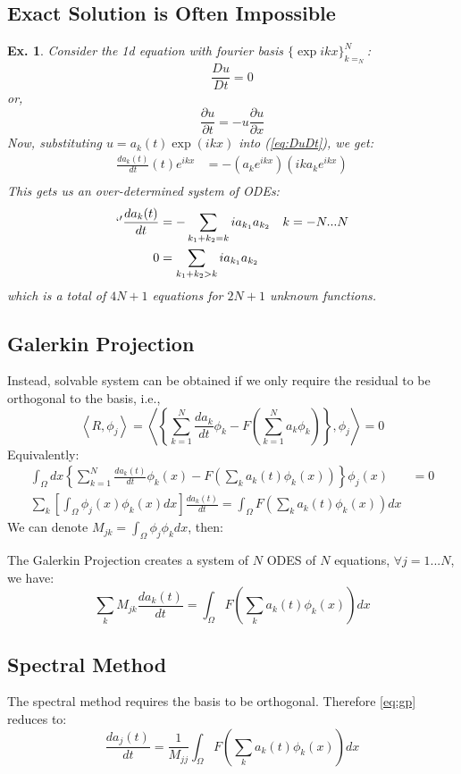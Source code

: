 \documentclass[14pt, twocolumn]{article}
\newtheorem{ex}{Ex.}
\newenvironment{tbox}{
    \begin{tcolorbox}[sharp corners, colback=white]
    
}{
    \end{tcolorbox}
}
\begin{document}
\subsection{Exact Solution is Often Impossible}

\begin{ex}
    Consider the 1d equation with fourier basis $\{\exp{ikx}\}_{k=_N}^N$:
    \begin{equation}
        \frac{Du}{Dt} = 0
            \label{eq:DuDt}
    \end{equation}
    or, 
    $$\frac{\partial u}{\partial t}= -u\frac{\partial u}{\partial x}$$
    Now, substituting $u=a_k(t)\exp(ikx)$ into (\ref{eq:DuDt}), we get:
    \begin{align*}
        \frac{da_k(t)}{dt}(t)e^{ikx} &= -(a_ke^{ikx})(ika_ke^{ikx}) \\
    \end{align*}
    This gets us an over-determined system of ODEs:
    \begin{equation}
        \begin{align}`'
            \frac{da_k(t)}{dt} &=  -\sum_{k_1+k_2=k} ia_{k_1}a_{k_2} & k=-N...N \\
            0 &= \sum_{k_1+k_2>k}  ia_{k_1}a_{k_2} &
        \end{align}
    \end{equation}
    which is a total of $4N+1$ equations for $2N+1$ unknown functions. 

\end{ex}

\subsection{Galerkin Projection}
Instead, solvable system can be obtained if we only require the residual to be orthogonal to  
the basis, i.e.,
$$
\left\langle R,\phi_j \right\rangle = \left\langle \left\{\sum_{k=1}^N \frac{da_k}{dt}\phi_k - F\left(\sum_{k=1}^N a_k\phi_k\right)\right\},\phi_j \right\rangle =0
$$
Equivalently:
\begin{align*}
    \int_{\Omega} dx \left\{\sum_{k=1}^N\frac{da_k(t)}{dt}\phi_k(x) - F\left(\sum_k a_k(t)\phi_k(x)\right) \right\} \phi_j(x) &=0 \\
    \sum_{k} \left[ \int_{\Omega}\phi_j(x)\phi_k(x)dx\right] \frac{da_k(t)}{dt} = \int_{\Omega}  F\left(\sum_k a_k(t)\phi_k(x)\right)dx
\end{align*}
We can denote $M_{jk}=\int_{\Omega}\phi_j \phi_k dx$, then:
\begin{tbox}
    The Galerkin Projection creates a system of $N$ ODES of $N$ equations, $\forall j=1...N$, we have:
    \begin{equation}
        \sum_k M_{jk} \frac{da_k(t)}{dt} = \int_{\Omega}  F\left(\sum_k a_k(t)\phi_k(x)\right)dx 
        \label{eq:gp}
    \end{equation}
\end{tbox}

\subsection{Spectral Method}
The spectral method requires the basis to be orthogonal. Therefore \ref{eq:gp} reduces to:
\begin{equation}
    \frac{da_j(t)}{dt} = \frac{1}{M_{jj}}\int_{\Omega}  F\left(\sum_k a_k(t)\phi_k(x)\right)dx 
\end{equation}
\end{document}
